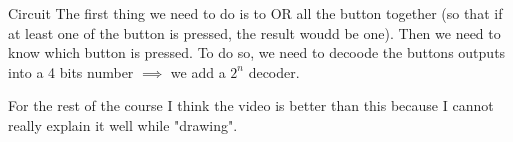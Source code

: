 \begin{parag}{Circuit}
    The first thing we need to do is to OR all the button together (so that if at least one of the button is pressed, the result woudd be one). Then we need to know which button is pressed. To do so, we need to decoode the buttons outputs into a 4 bits number $\implies $ we add a $2^n$ decoder. \\

	\begin{framedremark}
For the rest of the course I think the video is better than this because I cannot really explain it well while "drawing". 
	\end{framedremark}
\end{parag}


